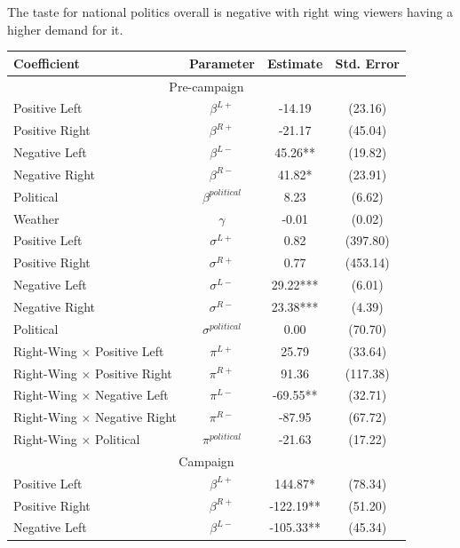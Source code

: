 \documentclass[12pt]{article}
\begin{document}
	The taste for national politics overall is negative with right wing viewers having a higher demand for it. 
	
\begin{table}[ht]
	\centering
	\begin{threeparttable}
		\begin{tabular}{lccc}
			\hline
			\textbf{Coefficient} & \textbf{Parameter} & \textbf{Estimate} & \textbf{Std. Error} \\
			\hline
			\multicolumn{4}{c}{Pre-campaign} \\
			\hline
			\hline
			Positive Left & $\beta^{L+}$ & -14.19 & (23.16) \\
			Positive Right & $\beta^{R+}$ & -21.17 & (45.04) \\
			Negative Left & $\beta^{L-}$ & 45.26** & (19.82) \\
			Negative Right & $\beta^{R-}$ & 41.82* & (23.91) \\
			Political & $\beta^{political}$ & 8.23 & (6.62) \\
			Weather & $\gamma$ & -0.01 & (0.02) \\
			\hline
			Positive Left & $\sigma^{L+}$ & 0.82 & (397.80) \\
			Positive Right & $\sigma^{R+}$ & 0.77 & (453.14) \\
			Negative Left & $\sigma^{L-}$ & 29.22*** & (6.01) \\
			Negative Right & $\sigma^{R-}$ & 23.38*** & (4.39) \\
			Political & $\sigma^{political}$ & 0.00 & (70.70) \\
			\hline
			Right-Wing $\times$  Positive Left & $\pi^{L+}$ & 25.79 & (33.64) \\
			Right-Wing $\times$  Positive Right & $\pi^{R+}$ & 91.36 & (117.38) \\
			Right-Wing $\times$  Negative Left & $\pi^{L-}$ & -69.55** & (32.71) \\
			Right-Wing $\times$  Negative Right & $\pi^{R-}$ & -87.95 & (67.72) \\
			Right-Wing $\times$  Political & $\pi^{political}$ & -21.63 & (17.22) \\
			\hline
			\hline
			\multicolumn{4}{c}{Campaign} \\
			\hline
			\hline
			Positive Left & $\beta^{L+}$ & 144.87* & (78.34) \\
			Positive Right & $\beta^{R+}$ & -122.19** & (51.20) \\
			Negative Left & $\beta^{L-}$ & -105.33** & (45.34) \\

\end{tabular}
\end{threeparttable}
\end{table}
\end{document}
